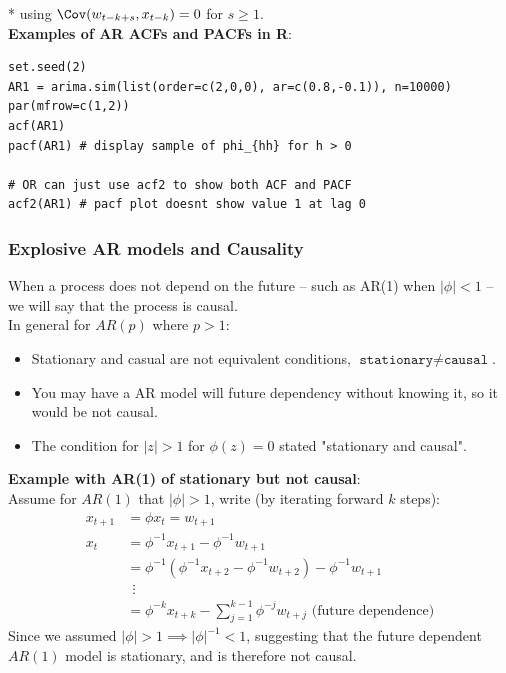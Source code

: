 \documentclass[11pt]{article}
\newcommand{\noi}{\noindent}
\begin{document}
\noindent
* using \(\Cov(w_{t-k+s},x_{t-k})=0\) for \(s\ge1\). \\

\noi \textbf{Examples of AR ACFs and PACFs in R}:
\begin{lstlisting}
set.seed(2)
AR1 = arima.sim(list(order=c(2,0,0), ar=c(0.8,-0.1)), n=10000)
par(mfrow=c(1,2))
acf(AR1)
pacf(AR1) # display sample of phi_{hh} for h > 0

# OR can just use acf2 to show both ACF and PACF
acf2(AR1) # pacf plot doesnt show value 1 at lag 0
\end{lstlisting}

\subsubsection{Explosive AR models and Causality}
\noi When a process does not depend on the future -- such as AR(1) when $|\phi| < 1$ -- we will say that the process is causal. \\

\noi In general for $AR(p)$ where $p > 1$:
\begin{itemize}
    \item Stationary and casual are not equivalent conditions, $\texttt{stationary} \neq \texttt{causal}$.
    \item You may have a AR model will future dependency without knowing it, so it would be not causal.
    \item The condition for $|z|>1$ for $\phi(z) = 0$ stated "stationary and causal".
\end{itemize} \phantom{i}

\noi \textbf{Example with AR(1) of stationary but not causal}: \\
\noi Assume for $AR(1)$ that $|\phi| > 1$, write (by iterating forward $k$ steps):
\begin{align*}
    x_{t+1} &= \phi x_t = w_{t+1} \\
    x_t &= \phi^{-1}x_{t+1} - \phi^{-1}w_{t+1} \\
    &= \phi^{-1}(\phi^{-1}x_{t+2} - \phi^{-1}w_{t+2}) - \phi^{-1}w_{t+1} \\
    & \ \ \vdots \\
    &= \phi^{-k}x_{t+k} - \sum_{j=1}^{k-1}{\phi^{-j}w_{t+j}} \text{ (future dependence)}
\end{align*} \phantom{i}
\noi Since we assumed $|\phi| > 1 \implies |\phi|^{-1} < 1$, suggesting that the future dependent $AR(1)$ model is stationary, and is therefore not causal.
\end{document}
